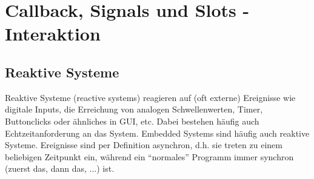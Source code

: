 
\section[Callbacks]{Callback, Signals und Slots - Interaktion}

\subsection{Reaktive Systeme}
Reaktive Systeme (reactive systems) reagieren auf (oft externe) Ereignisse wie digitale Inputs, die Erreichung von analogen Schwellenwerten, Timer, Buttonclicks oder ähnliches in GUI, etc. Dabei bestehen häufig auch Echtzeitanforderung an das System. Embedded Systems sind häufig auch reaktive Systeme.
Ereignisse sind per Definition asynchron, d.h. sie treten zu einem beliebigen Zeitpunkt ein, während ein ``normales'' Programm immer synchron (zuerst das, dann das, ...) ist.

